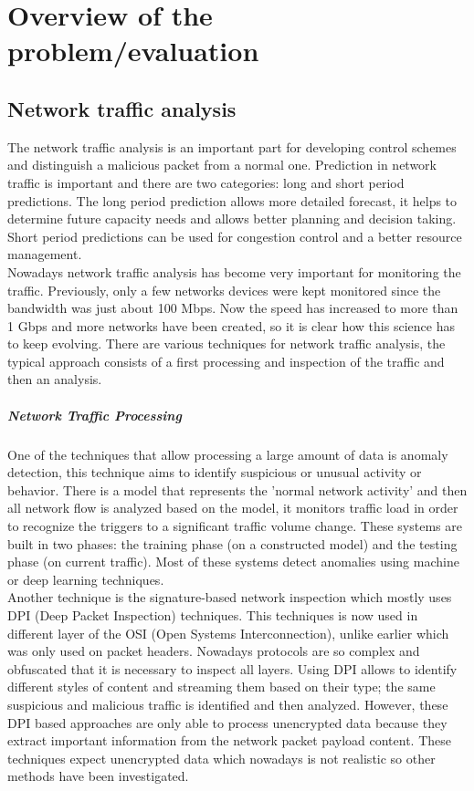 \section{Overview of the problem/evaluation}


\subsection{Network traffic analysis}
The network traffic analysis is an important part for developing control 
schemes and distinguish a malicious packet from a normal one. 
Prediction in network traffic is important and there are two categories: 
long and short period predictions. The long period prediction allows more 
detailed forecast, it helps to determine future capacity needs and allows 
better planning and decision taking. Short period predictions can be used 
for congestion control and a better resource management. \cite{network}
\\Nowadays network traffic analysis has become very important 
for monitoring the traffic. Previously, only a few networks devices were kept 
monitored since the bandwidth was just about 100 Mbps. Now the speed
has increased to more than 1 Gbps and more networks have been created, 
so it is clear how this science has to keep evolving.
There are various techniques for network traffic analysis, the typical approach 
consists of a first processing and inspection of the traffic and then an analysis. 
\subparagraph{Network Traffic Processing} One of the techniques that allow processing a 
large amount of data is anomaly detection, this technique aims to identify suspicious or unusual
activity or behavior. There is a model that represents the 'normal network activity' and then all 
network flow is analyzed based on the model, it monitors traffic load in order to recognize the 
triggers to a significant traffic volume change. These systems are built in two phases: the training 
phase (on a constructed model) and the testing phase (on current traffic). Most of these systems 
detect anomalies using machine or deep learning techniques.
\\Another technique is the signature-based network inspection which mostly uses DPI (Deep Packet Inspection) techniques. 
This techniques is now used in different layer of the OSI (Open Systems Interconnection), 
unlike earlier which was only used on packet headers. Nowadays protocols are so complex and obfuscated 
that it is necessary to inspect all layers. Using DPI allows to identify different styles of 
content and streaming them based on their type; the same suspicious and malicious traffic is identified and then analyzed.
However, these DPI based approaches are only able to process unencrypted data because they extract important information from the 
network packet payload content. These techniques expect unencrypted data which nowadays is not realistic so other 
methods have been investigated. \cite{ntaApplications}

